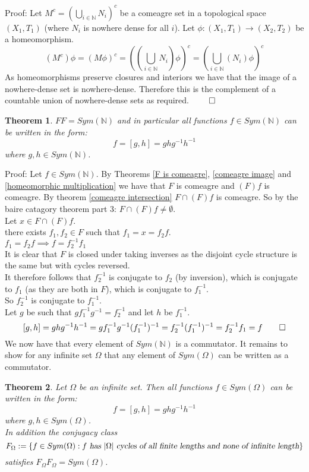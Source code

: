 \documentclass{report}
\newtheorem{theorem}{Theorem}[section]
\begin{document}
Proof: Let $M^c=(\bigcup_{i\in \mathbb{N}}N_i)^c$ be a comeagre set in a topological space $(X_1,T_1)$ (where $N_i$ is nowhere dense for all $i$). Let $\phi:(X_1,T_1)\rightarrow (X_2,T_2)$ be a homeomorphism.
\[(M^c)\phi = (M\phi)^c= ((\bigcup_{i \in \mathbb{N}}N_i)\phi)^c= (\bigcup_{i \in \mathbb{N}}(N_i)\phi)^c\]
As homeomorphisms preserve closures and interiors we have that the image of a nowhere-dense set is nowhere-dense. Therefore this is the complement of a countable union of nowhere-dense sets as required. $\qed$
\begin{theorem}\label{temp final}
$FF =Sym(\mathbb{N})$ and in particular all functions $f\in Sym(\mathbb{N})$ can be written in the form:
$$f=[g,h]=ghg^{-1}h^{-1}$$
where $g,h\in Sym(\mathbb{N})$.
\end{theorem}\par
Proof: Let $f\in Sym(\mathbb{N})$. By Theorems \ref{F is comeagre}, \ref{comeagre image} and \ref{homeomorphic multiplication} we have that $F$ is comeagre and $(F)f$ is comeagre. By theorem \ref{comeagre intersection} $F\cap (F)f$ is comeagre. So by the baire catagory theorem part 3: $F\cap (F)f \neq \emptyset$.\\
Let $x \in F\cap (F)f$.\\
there exists $f_1,f_2 \in F$ such that $f_1=x=f_2f$.\\
$f_1 = f_2 f \implies f = f_2^{-1} f_1$\\
It is clear that $F$ is closed under taking inverses as the disjoint cycle structure is the same but with cycles reversed.\\
It therefore follows that $f_2^{-1}$ is conjugate to $f_2$ (by inversion), which is conjugate to $f_1$ (as they are both in $F$), which is conjugate to $f_1^{-1}$.\\
So $f_2^{-1}$ is conjugate to $f_1^{-1}$.\\
Let $g$ be such that $gf_1^{-1}g^{-1} = f_2^{-1}$ and let $h$ be $f_1^{-1}$.
\[[g,h]=ghg^{-1}h^{-1}=gf_1^{-1} g^{-1}(f_1^{-1})^{-1}=f_2^{-1}(f_1^{-1})^{-1}= f_2^{-1}f_1=f \qed\]
We now have that every element of $Sym(\mathbb{N})$ is a commutator. It remains to show for any infinite set $\Omega$ that any element of $Sym(\Omega)$ can be written as a commutator.
\begin{theorem}\label{commutator result}
Let $\Omega$ be an infinite set. Then all functions $f\in Sym(\Omega)$ can be written in the form:
$$f=[g,h]=ghg^{-1}h^{-1}$$
where $g,h\in Sym(\Omega)$.\\
In addition the conjugacy class 
\[F_\Omega:= \{f \in Sym(\Omega): f\textsl{ has }\vert \Omega \vert \textsl{ cycles of all finite lengths and none of infinite length}\}\] 
satisfies $F_{\Omega}F_\Omega =Sym(\Omega)$.
\end{theorem}\par
\end{document}
